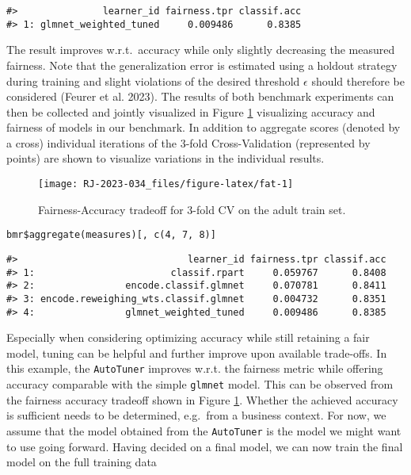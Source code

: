 \begin{verbatim}
#>               learner_id fairness.tpr classif.acc
#> 1: glmnet_weighted_tuned     0.009486      0.8385
\end{verbatim}

The result improves w.r.t.~accuracy while only slightly decreasing the measured fairness.
Note that the generalization error is estimated using a holdout strategy during training and slight violations of the desired threshold \(\epsilon\) should therefore be considered (Feurer et al. 2023).
The results of both benchmark experiments can then be collected and jointly visualized in Figure \ref{fig:fat} visualizing accuracy and fairness of models in our benchmark.
In addition to aggregate scores (denoted by a cross) individual iterations of the 3-fold Cross-Validation (represented by points) are shown to visualize variations in the individual results.

\begin{figure}

{\centering \texttt{[image: RJ-2023-034\_files/figure-latex/fat-1]} 

}

\caption{Fairness-Accuracy tradeoff for 3-fold CV on the adult train set.}\label{fig:fat}
\end{figure}

\begin{verbatim}
bmr$aggregate(measures)[, c(4, 7, 8)]
\end{verbatim}

\begin{verbatim}
#>                              learner_id fairness.tpr classif.acc
#> 1:                        classif.rpart     0.059767      0.8408
#> 2:                encode.classif.glmnet     0.070781      0.8411
#> 3: encode.reweighing_wts.classif.glmnet     0.004732      0.8351
#> 4:                glmnet_weighted_tuned     0.009486      0.8385
\end{verbatim}

Especially when considering optimizing accuracy while still retaining a fair model, tuning can be helpful and further improve upon available trade-offs.
In this example, the \texttt{AutoTuner} improves w.r.t. the fairness metric while offering accuracy comparable with the simple \texttt{glmnet} model.
This can be observed from the fairness accuracy tradeoff shown in Figure \ref{fig:fat}.
Whether the achieved accuracy is sufficient needs to be determined, e.g.~from a business context.
For now, we assume that the model obtained from the \texttt{AutoTuner} is the model we might want to use going forward.
Having decided on a final model, we can now train the final model on the full training data

